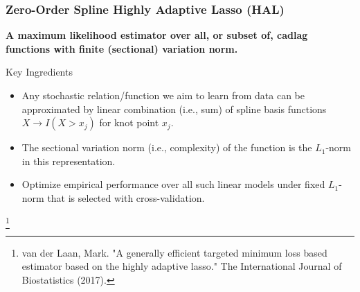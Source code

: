 \documentclass[t]{beamer}
\newcommand\blfootnote[1]{%
  \begingroup
  \renewcommand\thefootnote{}\footnote{#1}%
  \addtocounter{footnote}{-1}%
  \endgroup
}
\newlength{\wideitemsep}
\let\olditem\item
\renewcommand{\item}{\setlength{\itemsep}{\wideitemsep}\olditem}
\begin{document}

\begin{frame}
\frametitle{Zero-Order Spline Highly Adaptive Lasso (HAL)}

{\bf A maximum likelihood estimator over all, or subset of, cadlag functions with finite (sectional) variation norm.}

\begin{block}{\large{Key Ingredients}}
\begin{itemize}
\item Any stochastic relation/function we aim to learn from data can be approximated by linear combination (i.e., sum) of spline basis functions $X\rightarrow I(X>x_j)$ for knot point $x_j$.
\item The sectional variation norm (i.e., complexity) of the function is the $L_1$-norm in this representation.
\item Optimize empirical performance over all such linear models under fixed $L_1$-norm that is selected with cross-validation.
\vspace{.1in}
\end{itemize}
\end{block}

\blfootnote{van der Laan, Mark. "A generally efficient targeted minimum loss based estimator based on the highly adaptive lasso." The International Journal of Biostatistics (2017).}

\end{frame}
\end{document}
